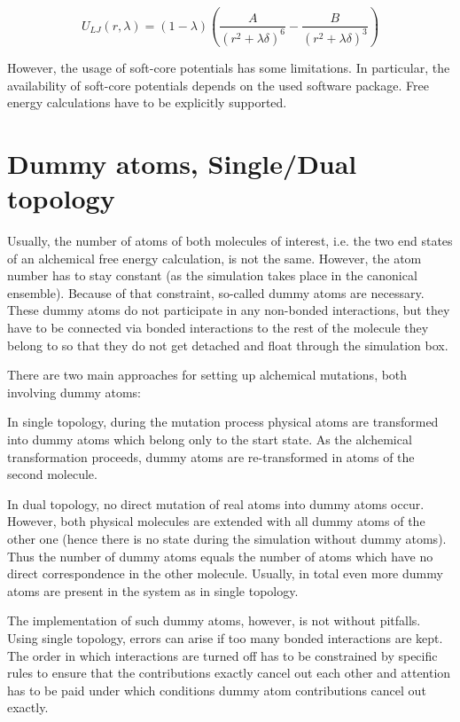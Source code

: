 \[
U_{LJ}\left(r,\lambda\right)=\left(1-\lambda\right)\left(\frac{A}{\left(r^{2}+\lambda\delta\right)^{6}}-\frac{B}{\left(r^{2}+\lambda\delta\right)^{3}}\right)
\]

However, the usage of soft-core potentials has some limitations. In
particular, the availability of soft-core potentials depends on the
used software package. Free energy calculations have to be explicitly
supported. 

\section{Dummy atoms, Single/Dual topology}

Usually, the number of atoms of both molecules of interest, i.e. the
two end states of an alchemical free energy calculation, is not
the same. However, the atom number has to stay constant (as the simulation
takes place in the canonical ensemble). Because of that constraint,
so-called dummy atoms are necessary. \cite{Fleck.2021} These dummy
atoms do not participate in any non-bonded interactions, but they
have to be connected via bonded interactions to the rest of the molecule
they belong to so that they do not get detached and float through
the simulation box.

There are two main approaches for setting up alchemical mutations, both involving dummy atoms: 

In single topology, during the mutation process physical atoms are
transformed into dummy atoms which belong only to the start state.
As the alchemical transformation proceeds, dummy atoms are re-transformed
in atoms of the second molecule.

In dual topology, no direct mutation of real atoms into dummy atoms
occur. However, both physical molecules are extended with all dummy
atoms of the other one (hence there is no state during the simulation
without dummy atoms). Thus the number of dummy atoms equals the number
of atoms which have no direct correspondence in the other molecule.
Usually, in total even more dummy atoms are present in the system
as in single topology. \cite{Fleck.2021}

The implementation of such dummy atoms, however, is not without pitfalls.
Using single topology, errors can arise if too many bonded interactions are kept. The order in which interactions are turned off has to be constrained
by specific rules to ensure that the contributions exactly cancel
out each other and attention has to be paid under which conditions
dummy atom contributions cancel out exactly. \cite{Fleck.2021}

